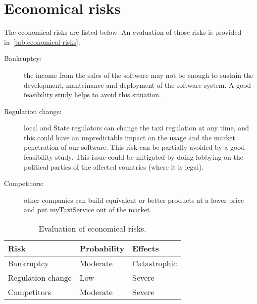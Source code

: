 \section{Economical risks}

The economical risks are listed below. An evaluation of those risks is provided in~\autoref{tab:economical-risks}.

\begin{description}
    \item[Bankruptcy:] the income from the sales of the software may not be enough to sustain the development, manteinance and deployment of the software system. A good feasibility study helps to avoid this situation.

    \item[Regulation change:] local and State regulators can change the taxi regulation at any time, and this could have an unpredictable impact on the usage and the market penetration of our software.
    This risk can be partially avoided by a good feasibility study. This issue could be mitigated by doing lobbying on the political parties of the affected countries (where it is legal).

    \item[Competitors:] other companies can build equivalent or better products at a lower price and put myTaxiService out of the market.
\end{description}

\begin{table}[p]
\centering
    \begin{tabular}{| l | l | l |}
        \hline
        \textbf{Risk}       & \textbf{Probability}  & \textbf{Effects}  \\
        \hline
        Bankruptcy          & Moderate              & Catastrophic      \\
        \hline
        Regulation change   & Low                   & Severe            \\
        \hline
        Competitors         & Moderate              & Severe            \\
        \hline
    \end{tabular}
    \caption{Evaluation of economical risks.}
    \label{tab:economical-risks}
\end{table}
